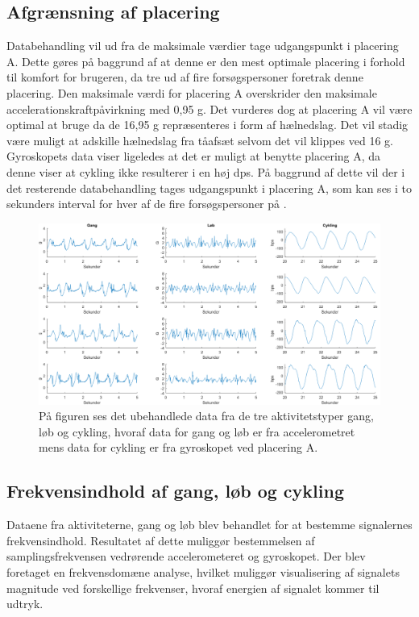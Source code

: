 \subsection{Afgrænsning af placering}
Databehandling vil ud fra de maksimale værdier tage udgangspunkt i placering A. Dette gøres på baggrund af at denne er den mest optimale placering i forhold til komfort for brugeren, da tre ud af fire forsøgspersoner foretrak denne placering. Den maksimale værdi for placering A overskrider den maksimale accelerationskraftpåvirkning med 0,95 g. Det vurderes dog at placering A vil være optimal at bruge da de 16,95 g repræsenteres i form af hælnedslag. Det vil stadig være muligt at adskille hælnedslag fra tåafsæt selvom det vil klippes ved 16 g. \newline
Gyroskopets data viser ligeledes at det er muligt at benytte placering A, da denne viser at cykling ikke resulterer i en høj dps. 
På baggrund af dette vil der i det resterende databehandling tages udgangspunkt i placering A, som kan ses i to sekunders interval for hver af de fire forsøgspersoner på .
\begin{figure}[H]
	\centering
	\includegraphics[scale=0.38]{figures/qBilag/raa_data}
	\caption{På figuren ses det ubehandlede data fra de tre aktivitetstyper gang, løb og cykling, hvoraf data for gang og løb er fra accelerometret mens data for cykling er fra gyroskopet ved placering A.}
	\label{raa_data}
\end{figure}

\subsection{Frekvensindhold af gang, løb og cykling}
Dataene fra aktiviteterne, gang og løb blev behandlet for at bestemme signalernes frekvensindhold. Resultatet af dette muliggør bestemmelsen af samplingsfrekvensen vedrørende accelerometeret og gyroskopet. Der blev foretaget en frekvensdomæne analyse, hvilket muliggør visualisering af signalets magnitude ved forskellige frekvenser, hvoraf energien af signalet kommer til udtryk.

